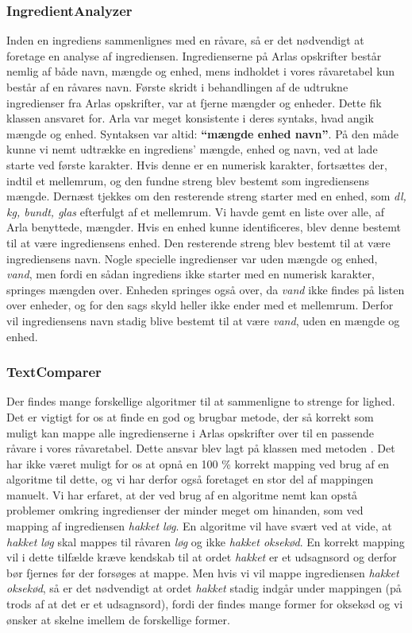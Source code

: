 \subsubsection{IngredientAnalyzer}
Inden en ingrediens sammenlignes med en råvare, så er det nødvendigt at foretage en analyse af ingrediensen. Ingredienserne på Arlas opskrifter består nemlig af både navn, mængde og enhed, mens indholdet i vores råvaretabel kun består af en råvares navn. Første skridt i behandlingen af de udtrukne ingredienser fra Arlas opskrifter, var at fjerne mængder og enheder. Dette fik klassen  ansvaret for. Arla var meget konsistente i deres syntaks, hvad angik mængde og enhed. Syntaksen var altid: \textbf{``mængde enhed navn''}.
På den måde kunne vi nemt udtrække en ingrediens' mængde, enhed og navn, ved at lade  starte ved første karakter. Hvis denne er en numerisk karakter, fortsættes der, indtil et mellemrum, og den fundne streng blev bestemt som ingrediensens mængde. Dernæst tjekkes om den resterende streng starter med en enhed, som \fx \textit{dl, kg, bundt, glas} efterfulgt af et mellemrum. Vi havde gemt en liste over alle, af Arla benyttede, mængder. Hvis en enhed kunne identificeres, blev denne bestemt til at være ingrediensens enhed. Den resterende streng blev bestemt til at være ingrediensens navn.
Nogle specielle ingredienser var uden mængde og enhed, \fx \textit{vand}, men fordi en sådan ingrediens ikke starter med en numerisk karakter, springes mængden over. Enheden springes også over, da \textit{vand} ikke findes på listen over enheder, og for den sags skyld heller ikke ender med et mellemrum. Derfor vil ingrediensens navn stadig blive bestemt til at være \textit{vand}, uden en mængde og enhed.

\subsubsection{TextComparer}
Der findes mange forskellige algoritmer til at sammenligne to strenge for lighed. Det er vigtigt for os at finde en god og brugbar metode, der så korrekt som muligt kan mappe alle ingredienserne i Arlas opskrifter over til en passende råvare i vores råvaretabel. Dette ansvar blev lagt på klassen  med metoden . Det har ikke været muligt for os at opnå en 100 \% korrekt mapping ved brug af en algoritme til dette, og vi har derfor også foretaget en stor del af mappingen manuelt. Vi har erfaret, at der ved brug af en algoritme nemt kan opstå problemer omkring ingredienser der minder meget om hinanden, som \fx ved mapping af ingrediensen \textit{hakket løg}. En algoritme vil have svært ved at vide, at \textit{hakket løg} skal mappes til råvaren \textit{løg} og ikke \textit{hakket oksekød}. En korrekt mapping vil i dette tilfælde kræve kendskab til at ordet \textit{hakket} er et udsagnsord og derfor bør fjernes før der forsøges at mappe. Men hvis vi vil mappe ingrediensen \textit{hakket oksekød}, så er det nødvendigt at ordet \textit{hakket} stadig indgår under mappingen (på trods af at det er et udsagnsord), fordi der findes mange former for oksekød og vi ønsker at skelne imellem de forskellige former.

